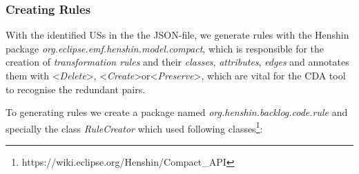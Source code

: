 \subsubsection*{Creating Rules}\label{design_workflow_rule_creator}
With the identified USs in the the JSON-file, we generate rules with the Henshin package \textit{org.eclipse.emf.henshin.model.compact}, which is responsible for the creation of \textit{transformation rules} and their \textit{classes}, \textit{attributes}, \textit{edges} and annotates them with \textless\emph{Delete}\textgreater, \textless\textit{Create}\textgreater or\textless\textit{Preserve}\textgreater, which are vital for the CDA tool to recognise the redundant pairs.

To generating rules we create a package named \textit{org.henshin.backlog.code.rule} and specially the class \textit{RuleCreator} which used following classes\footnote{https://wiki.eclipse.org/Henshin/Compact\_API}:
